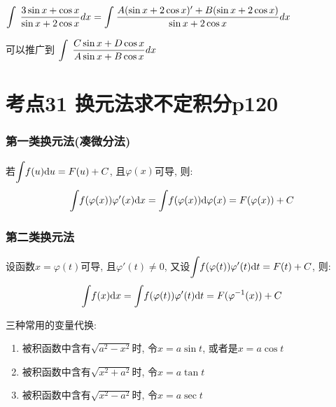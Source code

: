 \begin{tcolorbox}

\\

$\displaystyle\int_{}^{}\hspace{.2em}\frac{3\sin x+\cos x}{\sin x+2\cos x}dx=\int_{}^{}\frac{A(\sin x+2\cos x)'+B(\sin x+2\cos x)}{\sin x+2\cos x}dx$

可以推广到 $\displaystyle\int_{}^{}\hspace{.2em}\frac{C\sin x+D\cos x}{A\sin x+B\cos x}dx$

\end{tcolorbox}

\section{考点31 换元法求不定积分p120}

\subsubsection{第一类换元法(凑微分法)}
若$ \displaystyle\int_{}\hspace{.2em}f(u)\mathrm{d}u=F(u)+C $, 且$ \varphi(x) $可导, 则:
\begin{equation*}
\displaystyle\int_{}\hspace{.2em}f(\varphi(x))\varphi'(x)\mathrm{d}x=\displaystyle\int_{}\hspace{.2em}f(\varphi(x))\mathrm{d}\varphi(x)=F(\varphi(x))+C
\end{equation*}
\subsubsection{第二类换元法}
设函数$ x=\varphi(t) $可导, 且$ \varphi'(t)\neq 0 $, 又设$ \displaystyle\int_{}\hspace{.2em}f(\varphi(t))\varphi'(t)\mathrm{d}t=F(t)+C $, 则:
\begin{equation*}
\displaystyle\int_{}\hspace{.2em}f(x)\mathrm{d}x=\displaystyle\int_{}\hspace{.2em}f(\varphi(t))\varphi'(t)\mathrm{d}t=F(\varphi^{-1}(x))+C
\end{equation*}
\begin{tcolorbox}
三种常用的变量代换:
\begin{enumerate}
\item 被积函数中含有$ \sqrt{a^{2}-x^{2}} $时, 令$ x=a\sin t $, 或者是$ x=a\cos t $
\item 被积函数中含有$ \sqrt{x^{2}+a^{2}} $时, 令$ x=a\tan t $
\item 被积函数中含有$ \sqrt{x^{2}-a^{2}} $时, 令$ x=a\sec t $
\end{enumerate}
\end{tcolorbox}

